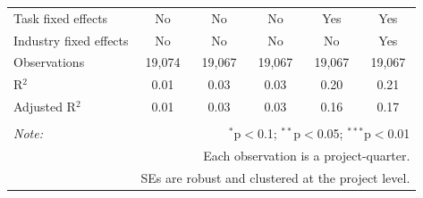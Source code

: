 \documentclass[
]{article}
\begin{document}
\begin{table}[H]
\begin{tabular}{@{\extracolsep{-2pt}}lccccc}
Task fixed effects & No & No & No & Yes & Yes \\ 
Industry fixed effects & No & No & No & No & Yes \\ 
Observations & 19,074 & 19,067 & 19,067 & 19,067 & 19,067 \\ 
R$^{2}$ & 0.01 & 0.03 & 0.03 & 0.20 & 0.21 \\ 
Adjusted R$^{2}$ & 0.01 & 0.03 & 0.03 & 0.16 & 0.17 \\ 
\hline 
\hline \\[-1.8ex] 
\textit{Note:}  & \multicolumn{5}{r}{$^{*}$p$<$0.1; $^{**}$p$<$0.05; $^{***}$p$<$0.01} \\ 
 & \multicolumn{5}{r}{Each observation is a project-quarter.} \\ 
 & \multicolumn{5}{r}{SEs are robust and clustered at the project level.} \\ 
\end{tabular} 
\end{table}
\end{document}
